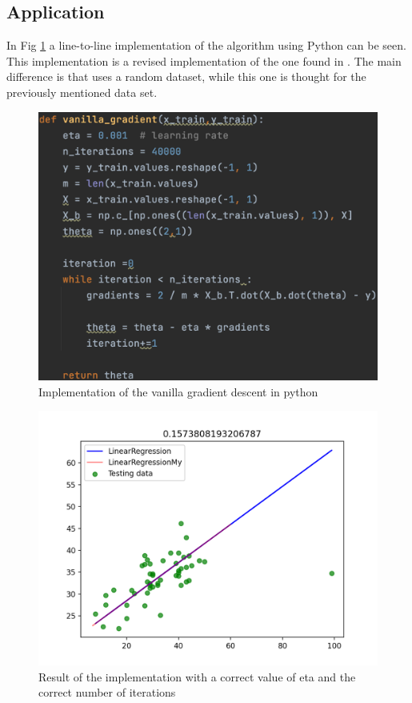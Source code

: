 \documentclass[conference]{IEEEtran}
\begin{document}
\subsection{Application}
In Fig \ref{fig:va_gr} a line-to-line implementation of the algorithm using Python can be seen. This implementation is a revised implementation of the one found in \cite{Scikit-Learn}. The main difference is that \cite{Scikit-Learn} uses a random dataset, while this one is thought for the previously mentioned data set. 
\begin{figure}[ht]
    \includegraphics[scale=0.4]{Figures/vanilla_gradient.png}
    \caption{Implementation of the vanilla gradient descent in python}
    \label{fig:va_gr}
\end{figure}

\begin{figure}[ht]
    \includegraphics[scale=0.58]{Figures/Figure_1.png}
    \caption{Result of the implementation with a correct value of eta and the correct number of iterations}
    \label{fig:va_gr_ben}
\end{figure}
\end{document}
